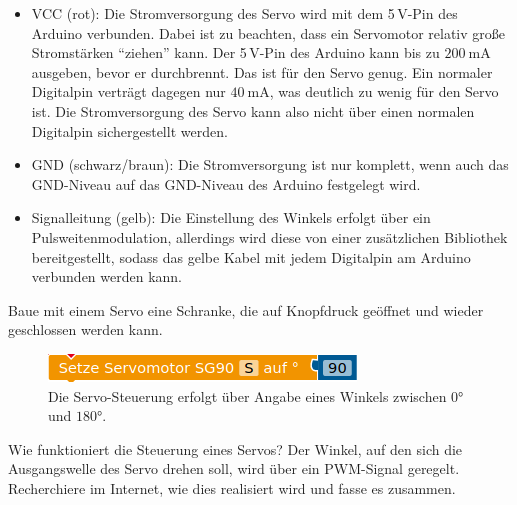 \begin{itemize}[itemsep=0mm, parsep=0mm]
	\item VCC (rot): Die Stromversorgung des Servo wird mit dem 5\,V-Pin des Arduino verbunden. Dabei ist zu beachten, dass ein Servomotor relativ große Stromstärken \enquote{ziehen} kann. Der 5\,V-Pin des Arduino kann bis zu $\SI{200}{\milli\ampere}$ ausgeben, bevor er durchbrennt. Das ist für den Servo genug. Ein normaler Digitalpin verträgt dagegen nur $\SI{40}{\milli\ampere}$, was deutlich zu wenig für den Servo ist. Die Stromversorgung des Servo kann also nicht über einen normalen Digitalpin sichergestellt werden.
	\item GND (schwarz/braun): Die Stromversorgung ist nur komplett, wenn auch das GND-Niveau auf das GND-Niveau des Arduino festgelegt wird.
	\item Signalleitung (gelb): Die Einstellung des Winkels erfolgt über ein Pulsweitenmodulation, allerdings wird diese von einer zusätzlichen Bibliothek bereitgestellt, sodass das gelbe Kabel mit jedem Digitalpin am Arduino verbunden werden kann.
\end{itemize}

\medskip
\begin{projekt}[Schranke]\label{proj:schranke}
	\begin{minipage}{0.6\textwidth}
		Baue mit einem Servo eine Schranke, die auf Knopfdruck geöffnet und wieder geschlossen werden kann.		
	\end{minipage}
	\hfill
	\begin{minipage}{0.38\textwidth}
		\vspace{-\baselineskip}
		\begin{figure}[H]
			\centering
			\includegraphics[width=\textwidth]{./pics/servo-steuerung.png}
			\caption{Die Servo-Steuerung erfolgt über Angabe eines Winkels zwischen $\ang{0}$ und $\ang{180}$.}
		\end{figure}
	\end{minipage}
\end{projekt}

\begin{recherche}{Wie funktioniert die Steuerung eines Servos?}
	Der Winkel, auf den sich die Ausgangswelle des Servo drehen soll, wird über ein PWM-Signal geregelt. Recherchiere im Internet, wie dies realisiert wird und fasse es zusammen.
\end{recherche}

